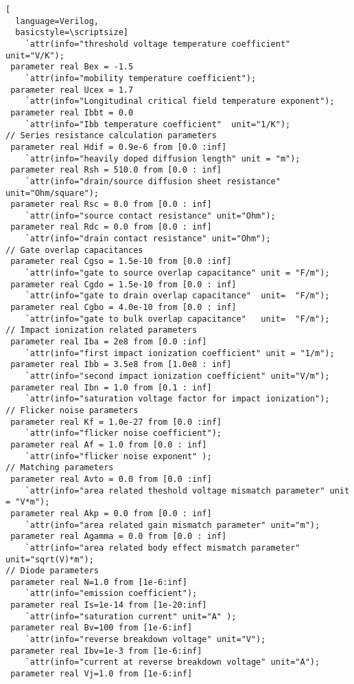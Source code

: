 \begin{lstlisting}[
  language=Verilog,
  basicstyle=\scriptsize]
	`attr(info="threshold voltage temperature coefficient" unit="V/K");
 parameter real Bex = -1.5     
	`attr(info="mobility temperature coefficient");
 parameter real Ucex = 1.7     
	`attr(info="Longitudinal critical field temperature exponent");
 parameter real Ibbt = 0.0     
	`attr(info="Ibb temperature coefficient"  unit="1/K");
// Series resistance calculation parameters
 parameter real Hdif = 0.9e-6 from [0.0 :inf]  
	`attr(info="heavily doped diffusion length" unit = "m");
 parameter real Rsh = 510.0 from [0.0 : inf]   
	`attr(info="drain/source diffusion sheet resistance" unit="Ohm/square");
 parameter real Rsc = 0.0 from [0.0 : inf]     
	`attr(info="source contact resistance" unit="Ohm");
 parameter real Rdc = 0.0 from [0.0 : inf]     
	`attr(info="drain contact resistance" unit="Ohm");
// Gate overlap capacitances
 parameter real Cgso = 1.5e-10 from [0.0 :inf]  
	`attr(info="gate to source overlap capacitance" unit = "F/m");
 parameter real Cgdo = 1.5e-10 from [0.0 : inf] 
	`attr(info="gate to drain overlap capacitance"  unit=  "F/m");
 parameter real Cgbo = 4.0e-10 from [0.0 : inf] 
	`attr(info="gate to bulk overlap capacitance"   unit=  "F/m");
// Impact ionization related parameters
 parameter real Iba = 2e8 from [0.0 :inf]        
	`attr(info="first impact ionization coefficient" unit = "1/m");
 parameter real Ibb = 3.5e8 from [1.0e8 : inf]   
	`attr(info="second impact ionization coefficient" unit="V/m");
 parameter real Ibn = 1.0 from [0.1 : inf]       
	`attr(info="saturation voltage factor for impact ionization");
// Flicker noise parameters
 parameter real Kf = 1.0e-27 from [0.0 :inf]   
	`attr(info="flicker noise coefficient");
 parameter real Af = 1.0 from [0.0 : inf]      
	`attr(info="flicker noise exponent" );
// Matching parameters
 parameter real Avto = 0.0 from [0.0 :inf]     
	`attr(info="area related theshold voltage mismatch parameter" unit = "V*m");
 parameter real Akp = 0.0 from [0.0 : inf]     
	`attr(info="area related gain mismatch parameter" unit="m");
 parameter real Agamma = 0.0 from [0.0 : inf]  
	`attr(info="area related body effect mismatch parameter" unit="sqrt(V)*m");
// Diode parameters
 parameter real N=1.0 from [1e-6:inf]          
	`attr(info="emission coefficient");
 parameter real Is=1e-14 from [1e-20:inf]      
	`attr(info="saturation current" unit="A" );
 parameter real Bv=100 from [1e-6:inf]        
	`attr(info="reverse breakdown voltage" unit="V");
 parameter real Ibv=1e-3 from [1e-6:inf]       
	`attr(info="current at reverse breakdown voltage" unit="A");
 parameter real Vj=1.0 from [1e-6:inf]         

\end{lstlisting}
